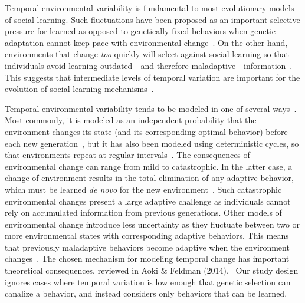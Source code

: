 \documentclass[letterpaper,11.5pt]{scrartcl}
\begin{document}
Temporal environmental variability is fundamental to most evolutionary models of
social learning. Such fluctuations have been proposed as an important selective
pressure for learned as opposed to genetically fixed behaviors when genetic adaptation cannot keep pace with environmental change~\citep{Richerson2000}. On the other hand, environments that change \emph{too} quickly will select against social learning so that individuals avoid learning outdated---and therefore maladaptive---information~\citep{Feldman1996,
BoydRicherson1985}. This suggests that intermediate levels of temporal variation
are important for the evolution of social learning mechanisms~\citep{aoki2005}.

Temporal environmental variability tends to be modeled in one of 
several ways~\citep{aoki2014evolution}. Most commonly, it is modeled
as an independent probability that the environment changes its state (and its corresponding optimal behavior) before each new generation~\citep{BoydRicherson1985,Rogers1988,Feldman1996,McElreath2005,Enquist2007,perreault2012bayesian,aoki2014evolution}, but
it has also been modeled using deterministic cycles, so that environments repeat at regular intervals~\citep{Feldman1996, aoki2014evolution}.
The consequences of environmental change can range from mild to catastrophic. In the latter case, a change of environment results in the total elimination of any adaptive behavior, which must be learned \emph{de novo} for the new environment~\citep{Rogers1988}. Such catastrophic environmental changes present
a large adaptive challenge as individuals cannot rely on accumulated information
from previous generations. Other models of environmental change introduce less
uncertainty as they fluctuate between two or more environmental states with corresponding adaptive behaviors. This means that previously maladaptive
behaviors become adaptive when the environment changes~\citep{perreault2012bayesian}. The chosen mechanism for modeling temporal change has important theoretical consequences, reviewed in Aoki \& Feldman (2014).~\nocite{aoki2014evolution} Our study design ignores cases where temporal variation is low enough that genetic selection can canalize a behavior, and instead considers only behaviors that can be learned.
\end{document}
